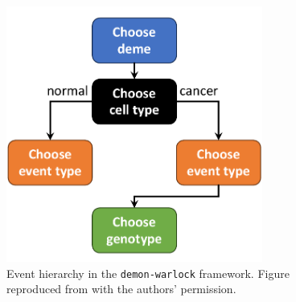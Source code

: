 \begin{figure}[h]
    \centering
    \includegraphics[width=0.75\textwidth]{Chapter_1/figures/demon_hierarchy.pdf}
    \caption{Event hierarchy in the \texttt{demon-warlock} framework. Figure reproduced from \cite{bak_warlock_2023} with
    the authors' permission.}
    \label{fig:demon_events}
\end{figure}

